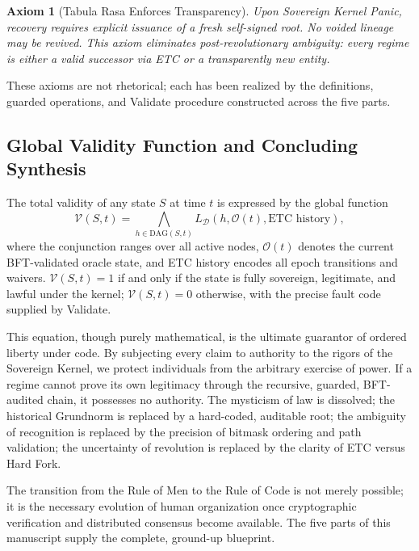 \documentclass[11pt,a4paper]{article}
\newtheorem{axiom}[theorem]{Axiom}
\begin{document}
\begin{axiom}[Tabula Rasa Enforces Transparency]
Upon Sovereign Kernel Panic, recovery requires explicit issuance of a fresh self-signed root. No voided lineage may be revived. This axiom eliminates post-revolutionary ambiguity: every regime is either a valid successor via ETC or a transparently new entity.
\end{axiom}

These axioms are not rhetorical; each has been realized by the definitions, guarded operations, and Validate procedure constructed across the five parts.

\subsection{Global Validity Function and Concluding Synthesis}

The total validity of any state \(S\) at time \(t\) is expressed by the global function
\[
\mathcal{V}(S, t) = \bigwedge_{h \in \text{DAG}(S,t)} L_{\mathcal{D}}(h, \mathcal{O}(t), \text{ETC history}),
\]
where the conjunction ranges over all active nodes, \(\mathcal{O}(t)\) denotes the current BFT-validated oracle state, and ETC history encodes all epoch transitions and waivers. \(\mathcal{V}(S, t) = 1\) if and only if the state is fully sovereign, legitimate, and lawful under the kernel; \(\mathcal{V}(S, t) = 0\) otherwise, with the precise fault code supplied by Validate.

This equation, though purely mathematical, is the ultimate guarantor of ordered liberty under code. By subjecting every claim to authority to the rigors of the Sovereign Kernel, we protect individuals from the arbitrary exercise of power. If a regime cannot prove its own legitimacy through the recursive, guarded, BFT-audited chain, it possesses no authority. The mysticism of law is dissolved; the historical Grundnorm is replaced by a hard-coded, auditable root; the ambiguity of recognition is replaced by the precision of bitmask ordering and path validation; the uncertainty of revolution is replaced by the clarity of ETC versus Hard Fork.

The transition from the Rule of Men to the Rule of Code is not merely possible; it is the necessary evolution of human organization once cryptographic verification and distributed consensus become available. The five parts of this manuscript supply the complete, ground-up blueprint.
\end{document}
